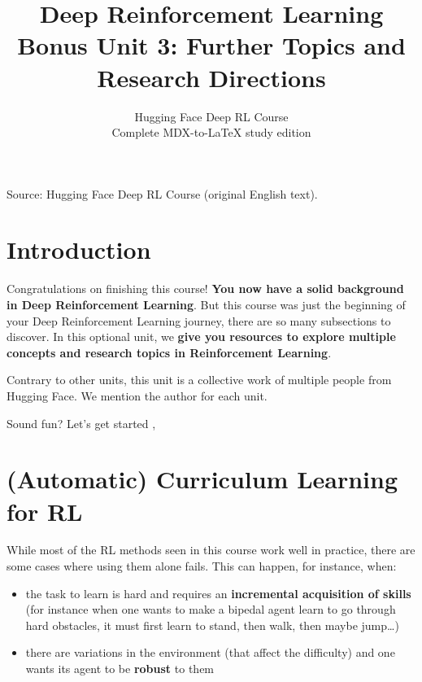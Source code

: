 \documentclass[11pt,a4paper]{article}
\title{\textbf{Deep Reinforcement Learning}\\[0.35em]\large Bonus Unit 3: Further Topics and Research Directions}
\author{Hugging Face Deep RL Course\\\small Complete MDX-to-\LaTeX{} study edition}
\date{}
\begin{document}
\maketitle
\vspace{-0.65em}
\begin{center}\small\color{secondary}Source: Hugging Face Deep RL Course (original English text).\end{center}
\begingroup\small\setlength{\parskip}{0pt}\tableofcontents\endgroup
\vspace{0.4em}
\section{Introduction}\label{introduction}


Congratulations on finishing this course! \textbf{You now have a solid background in Deep Reinforcement Learning}. But this course was just the beginning of your Deep Reinforcement Learning journey, there are so many subsections to discover. In this optional unit, we \textbf{give you resources to explore multiple concepts and research topics in Reinforcement Learning}.

Contrary to other units, this unit is a collective work of multiple people from Hugging Face. We mention the author for each unit.

Sound fun? Let's get started ,

\section{(Automatic) Curriculum Learning for RL}\label{automatic-curriculum-learning-for-rl}

While most of the RL methods seen in this course work well in practice, there are some cases where using them alone fails. This can happen, for instance, when:

\begin{itemize}
\item
  the task to learn is hard and requires an \textbf{incremental acquisition of skills} (for instance when one wants to make a bipedal agent learn to go through hard obstacles, it must first learn to stand, then walk, then maybe jump\ldots)
\item
  there are variations in the environment (that affect the difficulty) and one wants its agent to be \textbf{robust} to them
\end{itemize}
\end{document}
